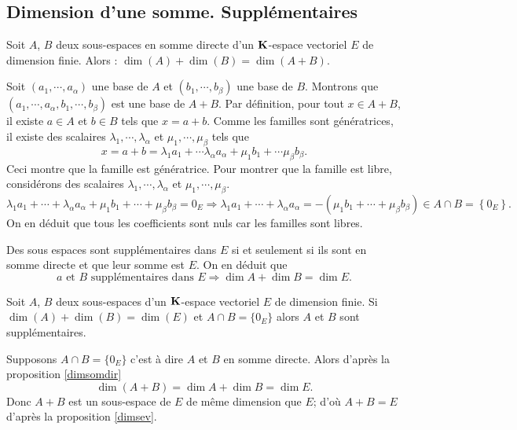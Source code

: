 \subsection{Dimension d'une somme. Supplémentaires}
\begin{propn}\label{dimsomdir}
 Soit $A$, $B$ deux sous-espaces en somme directe d'un $\mathbf{K}$-espace vectoriel $E$ de dimension finie. Alors :
$\dim (A) + \dim(B) = \dim(A + B)$.
\end{propn}
\begin{demo}
Soit $(a_1,\cdots,a_\alpha)$ une base de $A$ et $(b_1,\cdots,b_{\beta})$ une base de $B$. Montrons que $(a_1,\cdots,a_\alpha,b_1,\cdots,b_\beta)$ est une base de $A + B$.\newline
Par définition, pour tout $x \in A + B$, il existe $a\in A$ et $b\in B$ tels que $x = a + b$. Comme les familles sont génératrices, il existe des scalaires $\lambda_1, \cdots, \lambda_\alpha$ et $\mu_1, \cdots, \mu_\beta$ tels que 
\[
  x = a + b = \lambda_1 a_1 + \cdots \lambda_\alpha a_\alpha + \mu_1 b_1 + \cdots \mu_\beta b_\beta .
\]
Ceci montre que la famille est génératrice. Pour montrer que la famille est libre, considérons des scalaires $\lambda_1, \cdots, \lambda_\alpha$ et $\mu_1, \cdots, \mu_\beta$.
\[
  \lambda_1 a_1 +  \cdots + \lambda_\alpha a_\alpha + \mu_1 b_1 + \cdots + \mu_\beta b_\beta = 0_E 
  \Rightarrow
  \lambda_1 a_1 +  \cdots + \lambda_\alpha a_\alpha = -\left( \mu_1 b_1 + \cdots + \mu_\beta b_\beta\right) \in A \cap B = \left\lbrace 0_E \right\rbrace.
\]
On en déduit que tous les coefficients sont nuls car les familles sont libres.
\end{demo}
\begin{rem}\label{dimsup}
  Des sous espaces sont supplémentaires dans $E$ si et seulement si ils sont en somme directe et que leur somme est $E$. On en déduit que 
\[
  a \text{ et } B \text{ supplémentaires dans } E \Rightarrow \dim A + \dim B = \dim E.
\]
\end{rem}

\begin{propn}
Soit $A$, $B$ deux sous-espaces d'un $\mathbf{K}$-espace vectoriel $E$ de dimension finie.\newline
Si $\dim(A) + \dim(B) = \dim(E)$ et $A\cap B= \{0_E\}$ alors $A$ et $B$ sont supplémentaires.
\end{propn}
\begin{demo}
 Supposons $A\cap B= \{0_E\}$ c'est à dire $A$ et $B$ en somme directe. Alors d'après la proposition \ref{dimsomdir} 
 \[
   \dim(A + B) = \dim A + \dim B = \dim E .
 \]
 Donc $A + B$ est un sous-espace de $E$ de même dimension que $E$; d'où $A + B = E$ d'après la proposition \ref{dimsev}. 
\end{demo}

